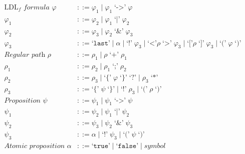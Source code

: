 \documentclass[preview=true]{standalone}
\begin{document}
\begin{table}[t]
\begin{align*}
\text{LDL}_{f} \textit{ formula }
  \varphi &::=
  \varphi_1
  \mid \varphi_1 \;\texttt{`->'}\; \varphi
\\
\varphi_1 &::=
  \varphi_2
  \mid \varphi_1 \;\texttt{`|'}\; \varphi_2
\\
\varphi_2 &::=
  \varphi_3
  \mid \varphi_2 \;\texttt{`\&'}\; \varphi_3
\\
\varphi_3 &::=
  \texttt{`last'}
  \mid \alpha
  \mid \texttt{`!'}\; \varphi_3
  \mid \texttt{`<'} \rho\; \texttt{`>'}\; \varphi_3
  \mid \texttt{`['} \rho\; \texttt{`]'}\; \varphi_3
  \mid \texttt{`('}\; \varphi \;\texttt{`)'}
\\
\textit{Regular path }
\rho &::=
  \rho_1
  \mid \rho \;\texttt{`+'}\; \rho_1
\\
\rho_1 &::=
  \rho_2
  \mid \rho_1 \;\texttt{`;'}\; \rho_2
\\
\rho_2 &::=
  \rho_3
  \mid \texttt{`\{'}\; \varphi \;\texttt{`\}'} \;\texttt{`?'}
  \mid \rho_3 \;\texttt{`*'}
\\
\rho_3 &::=
  \texttt{`\{'}\; \psi \;\texttt{`\}'}
  \mid \texttt{`!'}\; \rho_3
  \mid \texttt{`('}\; \rho \;\texttt{`)'}
\\
\textit{Proposition }
\psi &::=
  \psi_1
  \mid \psi_1 \;\texttt{`->'}\; \psi
\\
\psi_1 &::=
  \psi_2
  \mid \psi_1 \;\texttt{`|'}\; \psi_2
\\
\psi_2 &::=
  \psi_3
  \mid \psi_2 \;\texttt{`\&'}\; \psi_3
\\
\psi_3 &::=
  \alpha
  \mid \texttt{`!'}\; \psi_3
  \mid \texttt{`('}\; \psi \;\texttt{`)'}
\\
\textit{Atomic proposition }
\alpha &::=
  \texttt{`true'}
  \mid \texttt{`false'}
  \mid \textit{symbol}
\end{align*}
\end{table}
\smallskip
\end{document}
